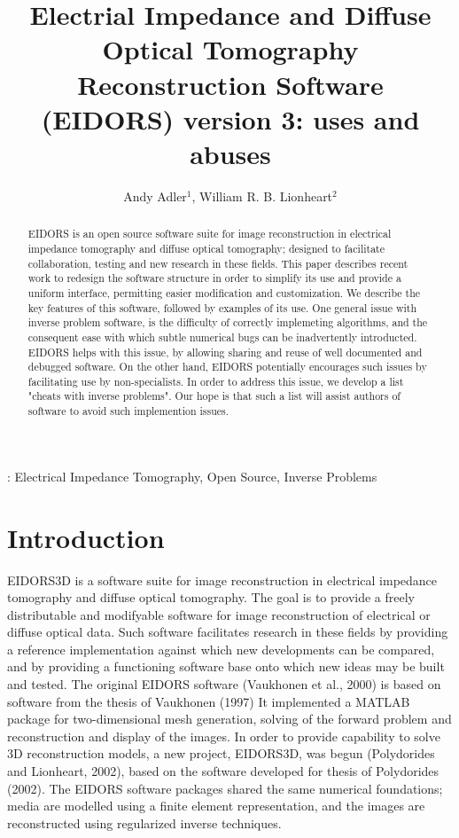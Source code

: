 \documentclass[12pt]{iopart}
\begin{document}
\title{Electrial Impedance and Diffuse Optical
       Tomography Reconstruction Software (EIDORS) version 3: uses and abuses}
\author{Andy Adler$^1$, William R. B. Lionheart$^2$}
\address{$^1$ School of Information Technology and Engineering (SITE), University of Ottawa, Canada}
\address{$^1$ School of Mathematics, University of Manchester, U.K.}

\begin{abstract} %

EIDORS is an open source software suite for image reconstruction in
electrical impedance tomography and diffuse optical tomography;
designed to facilitate collaboration, testing and new research
in these fields.  This paper describes recent work to
redesign the software structure in order to simplify its use
and provide a uniform interface,
permitting easier modification and customization.
We describe the key features of this software, followed by
examples of its use.
One general issue with inverse problem software, is the difficulty
of correctly implemeting algorithms, and the consequent ease with
which subtle numerical bugs can be inadvertently introducted.
EIDORS helps with this issue, by allowing sharing and reuse
of well documented and debugged software. On the other hand, 
EIDORS potentially encourages such issues by facilitating use
by non-specialists. In order to address this issue, we develop
a list "cheats with inverse problems". Our hope is that such
a list will assist authors of software to avoid such implemention
issues.


\end{abstract}
:
Electrical Impedance Tomography,
Open Source,
Inverse Problems

\section{Introduction}

EIDORS3D is a software suite for image reconstruction in
electrical impedance tomography and diffuse optical tomography.
The goal is to provide a freely distributable and modifyable
software for image reconstruction of electrical 
or diffuse optical data. Such software facilitates research
in these fields by providing a reference implementation
against which new developments can be compared, and by
providing a functioning software base onto which new
ideas may be built and tested.
The original EIDORS software (Vaukhonen et al., 2000) 
is based on software from the thesis of Vaukhonen (1997)
It implemented a MATLAB package for two-dimensional mesh generation,
solving of the forward
problem and reconstruction and display of the images.
In order to provide capability to solve 3D reconstruction models,
a new project, EIDORS3D, was begun (Polydorides and Lionheart, 2002),
based on the software developed for thesis of Polydorides (2002).
The EIDORS software packages shared the same numerical
foundations; media are modelled using a finite element representation,
and the images are reconstructed using regularized inverse techniques.
\end{document}
